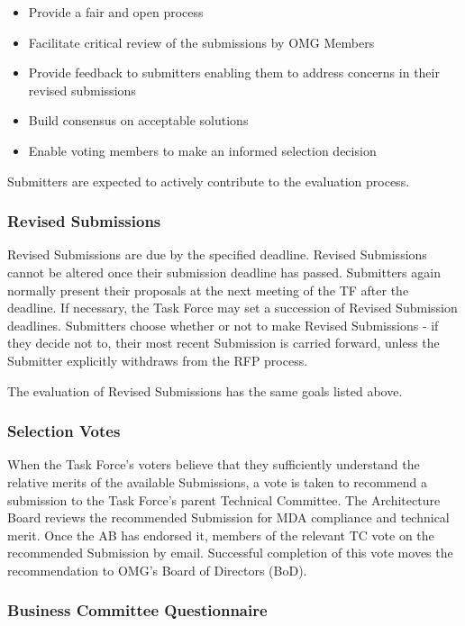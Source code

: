 \begin{itemize}
\item    Provide a fair and open process
\item    Facilitate critical review of the submissions by OMG Members
\item    Provide feedback to submitters enabling them to address concerns in their revised submissions
\item    Build consensus on acceptable solutions
\item    Enable voting members to make an informed selection decision

\end{itemize}
Submitters are expected to actively contribute to the evaluation process.


\subsubsection{Revised Submissions}

Revised Submissions are due by the specified deadline. Revised Submissions cannot be altered once their submission deadline has passed. Submitters again normally present their proposals at the next meeting of the TF after the deadline. If necessary, the Task Force may set a succession of Revised Submission deadlines. Submitters choose whether or not to make Revised Submissions - if they decide not to, their most recent Submission is carried forward, unless the Submitter explicitly withdraws from the RFP process.

The evaluation of Revised Submissions has the same goals listed above.


\subsubsection{Selection Votes}

When the Task Force's voters believe that they sufficiently understand the relative merits of the available Submissions, a vote is taken to recommend a submission to the Task Force's parent Technical Committee. The Architecture Board reviews the recommended Submission for MDA compliance and technical merit. Once the AB has endorsed it, members of the relevant TC vote on the recommended Submission by email. Successful completion of this vote moves the recommendation to OMG's Board of Directors (BoD).


\subsubsection{Business Committee Questionnaire}

